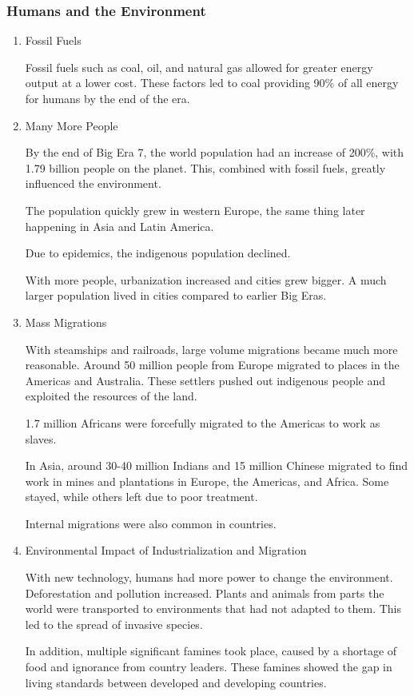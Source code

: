 \documentclass[11pt]{article}
\begin{document}
\subsubsection{Humans and the Environment}
\label{sec:orgcfb13c1}
\begin{enumerate}
\item Fossil Fuels
\label{sec:org29ca8db}

Fossil fuels such as coal, oil, and natural gas allowed for greater energy output at a lower cost. These factors led to coal providing 90\% of all energy for humans by the end of the era.

\item Many More People
\label{sec:orgb01757c}

By the end of Big Era 7, the world population had an increase of 200\%, with 1.79 billion people on the planet. This, combined with fossil fuels, greatly influenced the environment.

The population quickly grew in western Europe, the same thing later happening in Asia and Latin America.

Due to epidemics, the indigenous population declined.

With more people, urbanization increased and cities grew bigger. A much larger population lived in cities compared to earlier Big Eras.

\item Mass Migrations
\label{sec:org9a79f89}

With steamships and railroads, large volume migrations became much more reasonable. Around 50 million people from Europe migrated to places in the Americas and Australia. These settlers pushed out indigenous people and exploited the resources of the land.

1.7 million Africans were forcefully migrated to the Americas to work as slaves.

In Asia, around 30-40 million Indians and 15 million Chinese migrated to find work in mines and plantations in Europe, the Americas, and Africa. Some stayed, while others left due to poor treatment.

Internal migrations were also common in countries.

\item Environmental Impact of Industrialization and Migration
\label{sec:org85d56a3}

With new technology, humans had more power to change the environment. Deforestation and pollution increased. Plants and animals from parts the world were transported to environments that had not adapted to them. This led to the spread of invasive species.

In addition, multiple significant famines took place, caused by a shortage of food and ignorance from country leaders. These famines showed the gap in living standards between developed and developing countries.
\end{enumerate}
\end{document}
